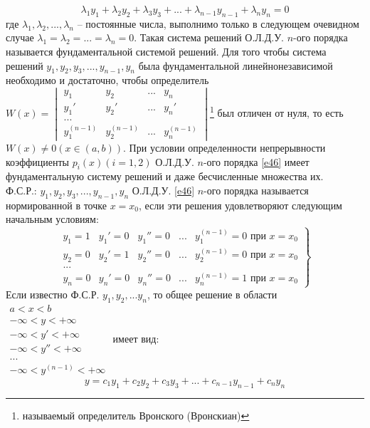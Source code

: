 \documentclass{article}
\numberwithin{equation}{section}
\begin{document}
\begin{equation}\label{e47}
\lambda_1y_1+\lambda_2y_2+\lambda_3y_3+...+\lambda_{n-1}y_{n-1}+\lambda_ny_n=0
\end{equation}
где $\lambda_1,\lambda_2,...,\lambda_n$ -- постоянные числа, выполнимо только в следующем очевидном случае $\lambda_1=\lambda_2=...=\lambda_n=0$. Такая система решений О.Л.Д.У. $n$-ого порядка называется фундаментальной системой решений. Для того чтобы система решений $y_1,y_2,y_3,...,y_{n-1},y_n$ была фундаментальной линейнонезависимой необходимо и достаточно, чтобы определитель $W(x)=\begin{vmatrix}
y_1 & y_2 & ... & y_n\\
y_1' & y_2' & ... & y_n'\\
...\\
y_1^{(n-1)} & y_2^{(n-1)} & ... & y_n^{(n-1)}
\end{vmatrix}$\footnote{называемый определитель Вронского (Вронскиан)} был отличен от нуля, то есть $W(x)\neq0(x\in(a,b))$. При условии определенности непрерывности коэффициенты $p_i(x)(i=1,2)$ О.Л.Д.У. $n$-ого порядка \eqref{e46} имеет фундаментальную систему решений и даже бесчисленные множества их.\\
Ф.С.Р.: $y_1,y_2,y_3,...,y_{n-1},y_n$ О.Л.Д.У. \eqref{e46} $n$-ого порядка называется нормированной в точке $x=x_0$, если эти решения удовлетворяют следующим начальным условиям:
\begin{equation}\label{e48}
\left.
\begin{matrix}
y_1=1 & y_1'=0 & y_1''=0 & ... & y_1^{(n-1)}=0\mbox{ при }x=x_0\\
y_2=0 & y_2'=1 & y_2''=0 & ... & y_2^{(n-1)}=0\mbox{ при }x=x_0\\
...\\
y_n=0 & y_n'=0 & y_n''=0 & ... & y_n^{(n-1)}=1\mbox{ при }x=x_0
\end{matrix}
\right\}
\end{equation}
Если известно Ф.С.Р. $y_1,y_2,...y_n$, то общее решение в области $\begin{matrix}
a<x<b\\
-\infty<y<+\infty\\
-\infty<y'<+\infty\\
-\infty<y''<+\infty\\
...\\
-\infty<y^{(n-1)}<+\infty
\end{matrix}$ имеет вид:
\begin{equation}\label{e49}
y=c_1y_1+c_2y_2+c_3y_3+...+c_{n-1}y_{n-1}+c_ny_n    
\end{equation}
\end{document}
